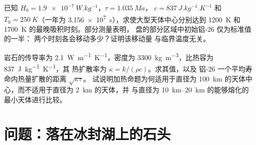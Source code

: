 \begin{exercise}[$\star\star\star$]\label{exo:b2:planet-formation-meteorites:11}
已知 $H_0 = \qty{1.9e-7}{W.kg^{-1}}$，$\tau = \qty{1.035}{Ma}$，
$c = \qty{837}{J.kg^{-1}.K^{-1}}$ 和 $T_0 = \qty{250}{K}$（一年为
\qty{3.156e7}{s}），求使大型天体中心分别达到
\qty{1200}{K} 和 \qty{1700}{K} 的最晚吸积时刻。部分测量表明，
盘的部分区域中初始铝-26 仅为标准值的一半：
两个时刻各会移动多少？证明该移动量
与临界温度无关。
\end{exercise}

\begin{exercise}[$\star\star\star$]\label{exo:b2:planet-formation-meteorites:12}
岩石的传导率为 \qty{2.1}{W.m^{-1}.K^{-1}}，密度为
\qty{3300}{kg.m^{-3}}，比热容为 \qty{837}{J.kg^{-1}.K^{-1}}，其
热扩散率为 $\kappa = k/(\rho c)$。求其值，以及
铝-26 一个平均寿命内热量扩散的距离 $\sqrt{\kappa\tau}$。
试说明加热命题为何适用于直径为
\qty{100}{km} 的天体中心，而不适用于直径为 \qty{2}{km} 的天体，并
与直径为 \qtyrange{10}{20}{km} 的能够熔化的最小天体进行比较。
\end{exercise}

\section{问题：落在冰封湖上的石头}

